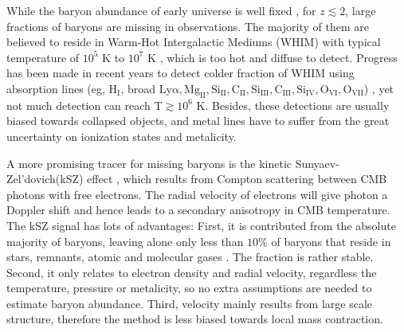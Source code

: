While the baryon abundance of early universe is well fixed 
\cite{Cooke14,Fukugita98,Komatsu11,Hinshaw13}, 
for $z\lesssim 2$, large fractions of baryons are missing in observations.  
The majority of them are believed to reside in Warm-Hot Intergalactic Mediums (WHIM) with typical temperature of $10^5$ K to $10^7$ K \cite{Pen1999,Soltan06}, which is too hot and diffuse to detect.
Progress has been made in recent years to detect colder fraction of WHIM using absorption lines 
(eg, $\mathrm{H_I}$, broad $\mathrm{Ly\alpha, Mg_{II},Si_{II}, C_{II}, Si_{III}, C_{III}, Si_{IV}, O_{VI}, O_{VII}}$) \cite{Bregman07,Werk14}, 
yet not much detection can reach T$\gtrsim 10^6$ K. 
Besides, these detections are usually biased towards collapsed objects, 
 and metal lines have to suffer from the great uncertainty on ionization states 
and metalicity.

A more promising tracer for missing baryons is the kinetic Sunyaev-Zel'dovich(kSZ) effect \cite{Sunyaev72,Sunyaev80,Vishniac87}, 
which results from Compton scattering between CMB photons with free electrons. 
The radial velocity of electrons will give photon a Doppler shift 
and hence leads to a 
secondary anisotropy in CMB temperature.
The kSZ signal has lots of advantages: 
First, it is contributed from the absolute majority of baryons, 
leaving alone only less than $10\%$ of baryons that 
reside in stars, remnants, atomic and molecular gases \cite{Fukugita04}. 
The fraction is rather stable.  
Second, it only relates to electron density and radial velocity, 
regardless the temperature, pressure or metalicity,  
so no extra assumptions are needed to estimate baryon abundance.  
Third, velocity mainly results from large scale structure, 
therefore the method is less biased towards local mass contraction.  

